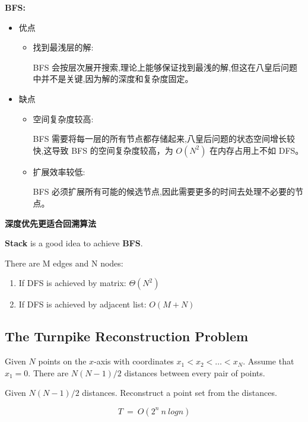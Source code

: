 \documentclass{article}
\begin{document}
\hspace*{\fill}\par
\textbf{BFS:}\par
\begin{itemize}
    \item 优点
        \begin{itemize}
            \item 找到最浅层的解:\par
            BFS 会按层次展开搜索,理论上能够保证找到最浅的解,但这在八皇后问题中并不是关键,因为解的深度和复杂度固定。
        \end{itemize}
    \item 缺点
        \begin{itemize}
            \item 空间复杂度较高:\par
            BFS 需要将每一层的所有节点都存储起来,八皇后问题的状态空间增长较快,这导致 BFS 的空间复杂度较高，为 $O(N^2)$ 在内存占用上不如 DFS。
            \item 扩展效率较低:\par
            BFS 必须扩展所有可能的候选节点,因此需要更多的时间去处理不必要的节点。
        \end{itemize}
\end{itemize}

\hspace*{\fill}\par
\textbf{深度优先更适合回溯算法}\par
\textbf{Stack} is a good idea to achieve \textbf{BFS}.\par
There are M edges and N nodes:
\begin{enumerate}
    \item If DFS is achieved by matrix:
    $\Theta (N^2)$
    \item If DFS is achieved by adjacent list:
    $O(M+N)$
\end{enumerate}
 
\subsection{The Turnpike Reconstruction Problem}
Given $N$ points on the $x$-axis with coordinates $x_1 <  x_2 < \dots < x_N$.  Assume that $x_1 = 0$.  There are $N ( N - 1 ) / 2$ distances between every pair of points.\par
Given $N ( N - 1 ) / 2$ distances.  Reconstruct a point set from the distances. 

$$T \ = \ O(2^n \ n \ log n)$$
\end{document}

